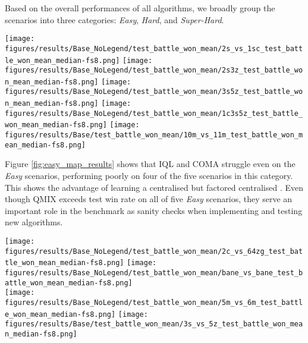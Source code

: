 \documentclass[twoside,11pt]{article}
\begin{document}
Based on the overall performances of all algorithms, we broadly group the scenarios into three categories: 
\textit{Easy},
\textit{Hard}, and
\textit{Super-Hard}.

\begin{figure*}[h!]
	\centering
	\texttt{[image: figures/results/Base\_NoLegend/test\_battle\_won\_mean/2s\_vs\_1sc\_test\_battle\_won\_mean\_median-fs8.png]}
	\texttt{[image: figures/results/Base\_NoLegend/test\_battle\_won\_mean/2s3z\_test\_battle\_won\_mean\_median-fs8.png]}
	\texttt{[image: figures/results/Base\_NoLegend/test\_battle\_won\_mean/3s5z\_test\_battle\_won\_mean\_median-fs8.png]}
	\texttt{[image: figures/results/Base\_NoLegend/test\_battle\_won\_mean/1c3s5z\_test\_battle\_won\_mean\_median-fs8.png]}
	\texttt{[image: figures/results/Base/test\_battle\_won\_mean/10m\_vs\_11m\_test\_battle\_won\_mean\_median-fs8.png]}
	\caption{Easy scenarios. The heuristic AI's performance shown as a dotted black line. 
	}
	\label{fig:easy_map_results}
\end{figure*}


Figure \ref{fig:easy_map_results} shows that IQL and COMA struggle even on the \emph{Easy} scenarios, performing poorly on four of the five scenarios in this category. This shows the advantage of learning a centralised but factored centralised . 
Even though QMIX exceeds  test win rate on all of five \emph{Easy} scenarios, they serve an important role in the benchmark as sanity checks when implementing and testing new algorithms. 

\begin{figure*}[h!]
	\centering
	\texttt{[image: figures/results/Base\_NoLegend/test\_battle\_won\_mean/2c\_vs\_64zg\_test\_battle\_won\_mean\_median-fs8.png]}
	\texttt{[image: figures/results/Base\_NoLegend/test\_battle\_won\_mean/bane\_vs\_bane\_test\_battle\_won\_mean\_median-fs8.png]}
	\\
	\texttt{[image: figures/results/Base\_NoLegend/test\_battle\_won\_mean/5m\_vs\_6m\_test\_battle\_won\_mean\_median-fs8.png]}
	\texttt{[image: figures/results/Base/test\_battle\_won\_mean/3s\_vs\_5z\_test\_battle\_won\_mean\_median-fs8.png]}
	\caption{Hard scenarios. The heuristic AI's performance shown as a dotted black line.}
	\label{fig:hard_map_results}
\end{figure*}
\end{document}
